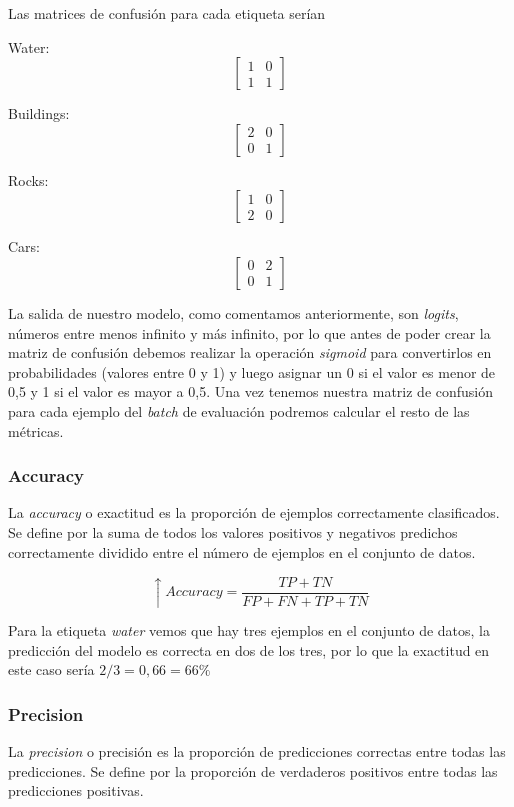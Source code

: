 Las matrices de confusión para cada etiqueta serían

Water:
\[\begin{bmatrix}
	1 & 0\\
	1 & 1
\end{bmatrix}\]

Buildings:
\[\begin{bmatrix}
	2 & 0\\
	0 & 1
\end{bmatrix}\]

Rocks:
\[\begin{bmatrix}
	1 & 0\\
	2 & 0
\end{bmatrix}\]

Cars:
\[\begin{bmatrix}
	0 & 2\\
	0 & 1
\end{bmatrix}\]

La salida de nuestro modelo, como comentamos anteriormente, son \textit{logits}, números entre menos infinito y más infinito, por lo que antes de poder crear la matriz de confusión debemos realizar la operación \textit{sigmoid} para convertirlos en probabilidades (valores entre 0 y 1) y luego asignar un 0 si el valor es menor de 0,5 y 1 si el valor es mayor a 0,5. Una vez tenemos nuestra matriz de confusión para cada ejemplo del \textit{batch} de evaluación podremos calcular el resto de las métricas.

\subsubsection{Accuracy}

La \textit{accuracy} o exactitud es la proporción de ejemplos correctamente clasificados. Se define por la suma de todos los valores positivos y negativos predichos correctamente dividido entre el número de ejemplos en el conjunto de datos.

\[\uparrow Accuracy = \frac{TP + TN}{FP + FN + TP + TN}\]

Para la etiqueta \textit{water} vemos que hay tres ejemplos en el conjunto de datos, la predicción del modelo es correcta en dos de los tres, por lo que la exactitud en este caso sería \(2 / 3 = 0,66 = 66\%\)

\subsubsection{Precision}

La \textit{precision} o precisión es la proporción de predicciones correctas entre todas las predicciones. Se define por la proporción de verdaderos positivos entre todas las predicciones positivas.

